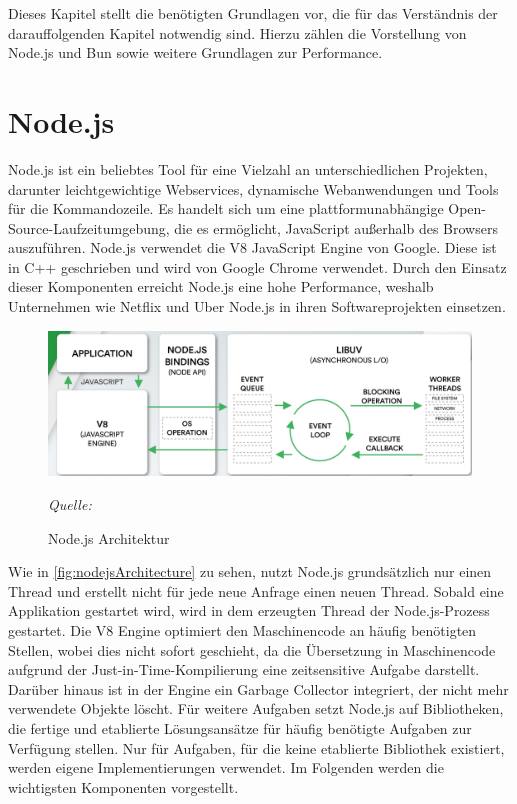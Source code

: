 \label{ch:foundations}
Dieses Kapitel stellt die benötigten Grundlagen vor, die für das Verständnis der darauffolgenden Kapitel notwendig sind. Hierzu zählen die Vorstellung von Node.js und Bun sowie weitere Grundlagen zur Performance.

\section{Node.js} \label{sec:foundations-Node.js}
Node.js ist ein beliebtes Tool für eine Vielzahl an unterschiedlichen Projekten, darunter leichtgewichtige Webservices, dynamische Webanwendungen und Tools für die Kommandozeile. Es handelt sich um eine plattformunabhängige Open-Source-Laufzeitumgebung, die es ermöglicht, JavaScript außerhalb des Browsers auszuführen. Node.js verwendet die V8 JavaScript Engine von Google. Diese ist in C++ geschrieben und wird von Google Chrome verwendet. Durch den Einsatz dieser Komponenten erreicht Node.js eine hohe Performance, weshalb Unternehmen wie Netflix und Uber Node.js in ihren Softwareprojekten einsetzen.\cite{OpenJSFoundation.2022}\\

\begin{figure}[h]
	\centering
	\includegraphics[width=\linewidth]{./images/NodeJsArchitecture}
	\caption{Node.js Architektur}
	\label{fig:nodejsArchitecture}
	\textit{Quelle: \cite{Kaneriya.2022}}
\end{figure}
 
\noindent
Wie in \autoref{fig:nodejsArchitecture} zu sehen, nutzt Node.js grundsätzlich nur einen Thread und erstellt nicht für jede neue Anfrage einen neuen Thread. Sobald eine Applikation gestartet wird, wird in dem erzeugten Thread der Node.js-Prozess gestartet. Die V8 Engine optimiert den Maschinencode an häufig benötigten Stellen, wobei dies nicht sofort geschieht, da die Übersetzung in Maschinencode aufgrund der Just-in-Time-Kompilierung eine zeitsensitive Aufgabe darstellt. Darüber hinaus ist in der Engine ein Garbage Collector integriert, der nicht mehr verwendete Objekte löscht.\cite{Springer.2022} \newline 
Für weitere Aufgaben setzt Node.js auf Bibliotheken, die fertige und etablierte Lösungsansätze für häufig benötigte Aufgaben zur Verfügung stellen. Nur für Aufgaben, für die keine etablierte Bibliothek existiert, werden eigene Implementierungen verwendet. Im Folgenden werden die wichtigsten Komponenten vorgestellt.\cite{Springer.2022}\\

